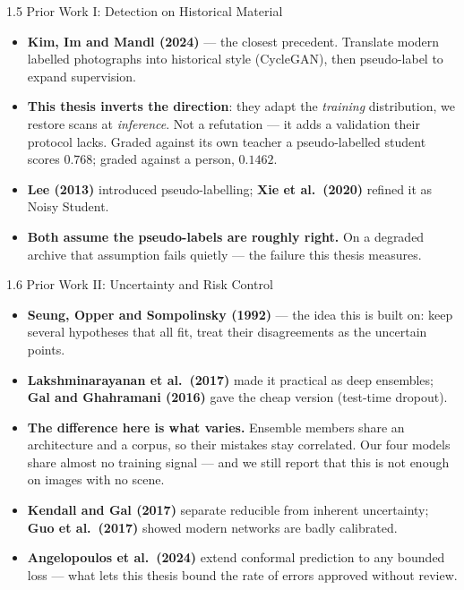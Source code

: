 \documentclass[aspectratio=169,11pt]{beamer}
\begin{document}
\begin{frame}{1.5 Prior Work I: Detection on Historical Material}
\footnotesize
\begin{itemize}
  \setlength\itemsep{6pt}
  \item \textbf{Kim, Im and Mandl (2024)} --- the closest precedent. Translate modern labelled photographs into historical style (CycleGAN), then pseudo-label to expand supervision.
  \item \textbf{This thesis inverts the direction}: they adapt the \emph{training} distribution, we restore scans at \emph{inference}. Not a refutation --- it adds a validation their protocol lacks. Graded against its own teacher a pseudo-labelled student scores $\mathbf{0.768}$; graded against a person, $\mathbf{0.1462}$.
  \item \textbf{Lee (2013)} introduced pseudo-labelling; \textbf{Xie et al.\ (2020)} refined it as Noisy Student.
  \item \textbf{Both assume the pseudo-labels are roughly right.} On a degraded archive that assumption fails quietly --- the failure this thesis measures.
\end{itemize}
\end{frame}

\begin{frame}{1.6 Prior Work II: Uncertainty and Risk Control}
\footnotesize
\begin{itemize}
  \setlength\itemsep{6pt}
  \item \textbf{Seung, Opper and Sompolinsky (1992)} --- the idea this is built on: keep several hypotheses that all fit, treat their disagreements as the uncertain points.
  \item \textbf{Lakshminarayanan et al.\ (2017)} made it practical as deep ensembles; \textbf{Gal and Ghahramani (2016)} gave the cheap version (test-time dropout).
  \item \textbf{The difference here is what varies.} Ensemble members share an architecture and a corpus, so their mistakes stay correlated. Our four models share almost no training signal --- and we still report that this is not enough on images with no scene.
  \item \textbf{Kendall and Gal (2017)} separate reducible from inherent uncertainty; \textbf{Guo et al.\ (2017)} showed modern networks are badly calibrated.
  \item \textbf{Angelopoulos et al.\ (2024)} extend conformal prediction to any bounded loss --- what lets this thesis bound the rate of errors approved without review.
\end{itemize}
\end{frame}
\end{document}
